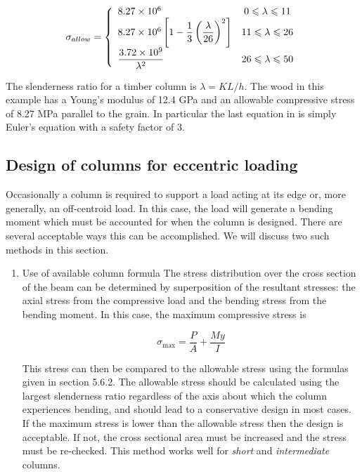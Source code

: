 \documentclass[a4paper,openany,12pt]{book}
\begin{document}
{{\begin{enumerate}
$$\sigma_{allow} = \left\{
    \begin{array}{l c}
      8.27 \times 10^6 & 0 \leqslant \lambda \leqslant 11 \\ 
      8.27 \times 10^6\left[ 1 - \dfrac{1}{3} \left( \dfrac{\lambda}{26} \right)^2 \right] & 11 \leqslant \lambda \leqslant 26 \\ 
      \dfrac{3.72 \times 10^9}{\lambda^2} & 26 \leqslant \lambda \leqslant 50 
    \end{array} \right.$$

The slenderness ratio for a timber column is \(\lambda = KL/h\). The wood
in this example has a Young's modulus of 12.4 GPa and an allowable
compressive stress of 8.27 MPa parallel to the grain. In particular the
last equation in is simply Euler's equation with a safety factor of 3.
\end{enumerate}


\subsection{Design of columns for eccentric loading}
\label{sec:org8a6c924}
Occasionally a column is required to support a load acting at its edge
or, more generally, an off-centroid load. In this case, the load will
generate a bending moment which must be accounted for when the column is
designed. There are several acceptable ways this can be accomplished. We
will discuss two such methods in this section.


\begin{enumerate}
\item Use of available column formula
\label{sec:org33a43b5}
The stress distribution over the cross section of the beam can be
determined by superposition of the resultant stresses: the axial stress
from the compressive load and the bending stress from the bending
moment. In this case, the maximum compressive stress is

$${\sigma_{\max}} = \frac{P}{A} + \frac{{My}}{I}$$

This stress can then be compared to the allowable stress using the
formulas given in section 5.6.2. The allowable stress should be
calculated using the largest slenderness ratio regardless of the axis
about which the column experiences bending, and should lead to a
conservative design in most cases. If the maximum stress is lower than
the allowable stress then the design is acceptable. If not, the cross
sectional area must be increased and the stress must be re-checked. This
method works well for \emph{short} and \emph{intermediate} columns.


\end{enumerate}}}
\end{document}
